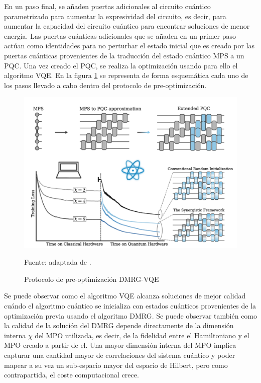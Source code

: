 En un paso final, se añaden puertas adicionales al circuito cuántico parametrizado para aumentar la expresividad del circuito, es decir, para aumentar la capacidad del circuito cuántico para encontrar soluciones de menor energía. Las puertas cuánticas adicionales que se añaden en un primer paso actúan como identidades para no perturbar el estado inicial que es creado por las puertas cuánticas provenientes de la traducción del estado cuántico MPS a un PQC. Una vez creado el PQC, se realiza la optimización usando para ello el algoritmo VQE. En la figura \ref{fig:prep_dmrg} se representa de forma esquemática cada uno de los pasos llevado a cabo dentro del protocolo de pre-optimización.

\begin{figure}[!h]
    \centering
    \includegraphics[scale = 0.6]{img/05-preprocesado_DMRG_VQE.png}
    \caption{Protocolo de pre-optimización DMRG-VQE}
    Fuente: adaptada de \citep{manuel}.
    \label{fig:prep_dmrg}
\end{figure}

Se puede observar como el algoritmo VQE alcanza soluciones de mejor calidad cuándo el algoritmo cuántico se inicializa con estados cuánticos provenientes de la optimización previa usando el algoritmo DMRG. Se puede observar también como la calidad de la solución del DMRG depende directamente de la dimensión interna $\chi$ del MPO utilizada, es decir, de la fidelidad entre el Hamiltoniano y el MPO creado a partir de el. Una mayor dimensión interna del MPO implica capturar una cantidad mayor de correlaciones del sistema cuántico y poder mapear a su vez un sub-espacio mayor del espacio de Hilbert, pero como contrapartida, el coste computacional crece.

